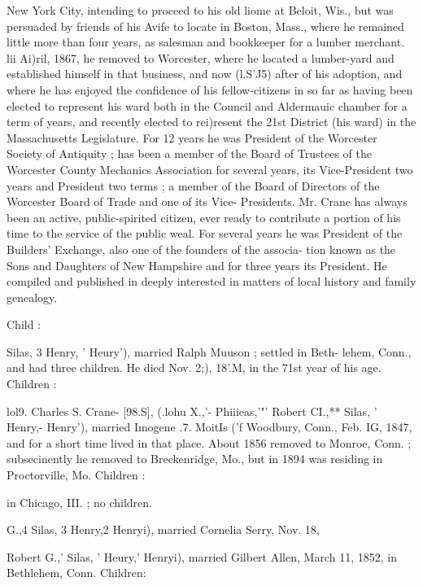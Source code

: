 \documentclass[oneside]{book}
\begin{document}
New York City, intending to proceed to his old liome at Beloit, 
Wis., but was persuaded by friends of his Avife to locate in 
Boston, Mass., where he remained little more than four years, as 
salesman and bookkeeper for a lumber merchant. lii Ai)ril, 
1867, he removed to Worcester, where he located a lumber-yard 
and established himself in that business, and now (l.S'J5) after 
of his adoption, and where he has enjoyed the confidence of his 
fellow-citizens in so far as having been elected to represent his 
ward both in the Council and Aldermauic chamber for a term of 
years, and recently elected to rei)resent the 21st District (his 
ward) in the Massachusetts Legislature. For 12 years he was 
President of the Worcester Society of Antiquity ; has been a 
member of the Board of Trustees of the Worcester County 
Mechanics Association for several years, its Vice-President two 
years and President two terms ; a member of the Board of 
Directors of the Worcester Board of Trade and one of its Vice- 
Presidents. Mr. Crane has always been an active, public-spirited 
citizen, ever ready to contribute a portion of his time to the 
service of the public weal. For several years he was President 
of the Builders' Exchange, also one of the founders of the associa- 
tion known as the Sons and Daughters of New Hampshire and 
for three years its President. He compiled and published in 
deeply interested in matters of local history and family genealogy. 

Child : 


Silas, 3 Henry, ' Heury'), married Ralph Muuson ; settled in Beth- 
lehem, Conn., and had three children. He died Nov. 2;), 18'.M, 
in the 71st year of his age. Children : 




lol9. Charles S. Crane- [98.S], (.lohu X.,'- Phiiieas,'"' 
Robert CI.,** Silas, ' Henry,- Henry'), married Imogene .7. MoitIs 
('f Woodbury, Conn., Feb. IG, 1847, and for a short time lived in 
that place. About 1856 removed to Monroe, Conn. ; subsecinently 
he removed to Breckenridge, Mo., but in 1894 was residing in 
Proctorville, Mo. Children : 


in Chicago, III. ; no children. 





G.,4 Silas, 3 Henry,2 Henryi), married Cornelia Serry, Nov. 18, 


Robert G.,' Silas, ' Heury,' Henryi), married Gilbert Allen, 
March 11, 1852, in Bethlehem, Conn. Children: 
\end{document}
